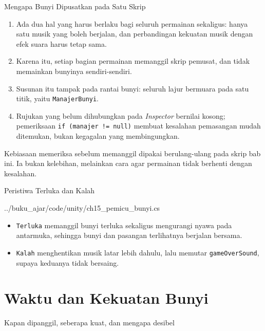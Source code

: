 \documentclass[aspectratio=169,10pt]{beamer}
\begin{document}
\begin{frame}{Mengapa Bunyi Dipusatkan pada Satu Skrip}
\begin{enumerate}
  \item Ada dua hal yang harus berlaku bagi seluruh permainan sekaligus: hanya
        satu musik yang boleh berjalan, dan perbandingan kekuatan musik dengan
        efek suara harus tetap sama.
  \item Karena itu, setiap bagian permainan memanggil skrip pemusat, dan tidak
        memainkan bunyinya sendiri-sendiri.
  \item Susunan itu tampak pada rantai bunyi: seluruh lajur bermuara pada satu
        titik, yaitu \texttt{ManajerBunyi}.
  \item Rujukan yang belum dihubungkan pada \emph{Inspector} bernilai kosong;
        pemeriksaan \texttt{if (manajer != null)} membuat kesalahan pemasangan
        mudah ditemukan, bukan kegagalan yang membingungkan.
\end{enumerate}
\vspace{0.12cm}
\begin{kotak}
Kebiasaan memeriksa sebelum memanggil dipakai berulang-ulang pada skrip bab
ini. Ia bukan kelebihan, melainkan cara agar permainan tidak berhenti dengan
kesalahan.
\end{kotak}
\end{frame}

\begin{frame}[fragile]{Peristiwa Terluka dan Kalah}

  {../buku_ajar/code/unity/ch15_pemicu_bunyi.cs}
\begin{itemize}
  \item \texttt{Terluka} memanggil bunyi terluka sekaligus mengurangi nyawa
        pada antarmuka, sehingga bunyi dan pasangan terlihatnya berjalan
        bersama.
  \item \texttt{Kalah} menghentikan musik latar lebih dahulu, lalu memutar
        \texttt{gameOverSound}, supaya keduanya tidak bersaing.
\end{itemize}
\end{frame}

\section{Waktu dan Kekuatan Bunyi}
  {Kapan dipanggil, seberapa kuat, dan mengapa desibel}
\end{document}
